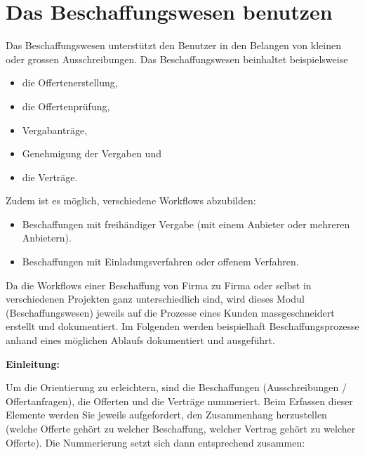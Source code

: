 
\clearpage
\section{Das Beschaffungswesen benutzen}

Das Beschaffungswesen unterstützt den Benutzer in den Belangen von kleinen oder grossen Ausschreibungen. Das Beschaffungswesen beinhaltet beispielsweise

\begin{itemize}
\item die Offertenerstellung,
\item die Offertenprüfung,
\item Vergabanträge,
\item Genehmigung der Vergaben und
\item die Verträge.
\end{itemize}

\vspace{\baselineskip}

Zudem ist es möglich, verschiedene Workflows abzubilden:

\begin{itemize}
\item Beschaffungen mit freihändiger Vergabe (mit einem Anbieter oder mehreren Anbietern).
\item Beschaffungen mit Einladungsverfahren oder offenem Verfahren.
\end{itemize}

\vspace{\baselineskip}

Da die Workflows einer Beschaffung von Firma zu Firma oder selbst in verschiedenen Projekten ganz unterschiedlich sind, wird dieses Modul (Beschaffungswesen) jeweils auf die Prozesse eines Kunden massgeschneidert erstellt und dokumentiert. Im Folgenden werden beispielhaft Beschaffungsprozesse anhand eines möglichen Ablaufs dokumentiert und ausgeführt.

\vspace{\baselineskip}

\textbf{Einleitung:}

Um die Orientierung zu erleichtern, sind die Beschaffungen (Ausschreibungen / Offertanfragen), die Offerten und die Verträge nummeriert. Beim Erfassen dieser Elemente werden Sie jeweils aufgefordert, den Zusammenhang herzustellen (welche Offerte gehört zu welcher Beschaffung, welcher Vertrag gehört zu welcher Offerte). Die Nummerierung setzt sich dann entsprechend zusammen:

